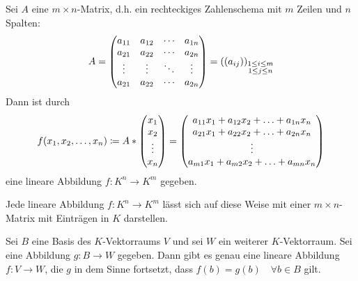 Sei $A$ eine $m\times n$-Matrix, d.h. ein rechteckiges Zahlenschema mit $m$ Zeilen und $n$ Spalten:
\newcommand{\ma}[1]{\ensuremath a_{#1}}
\begin{equation*}
  A=
  \matrix{
  \ma{11} & \ma{12} & \cdots & \ma{1n}\\
  \ma{21} & \ma{22} & \cdots & \ma{2n}\\
  \vdots & \vdots & \ddots & \vdots\\
  \ma{21} & \ma{22} & \cdots & \ma{2n}\\
  }
  = ((a_{ij}))_{\substack{1\leq i\leq m\\1\leq j\leq n}}
\end{equation*}
Dann ist durch
\begin{equation*}
  f(x_1,x_2,\ldots,x_n)\coloneqq A*\matrix{x_1\\x_2\\\vdots\\x_n}
  =\matrix{
  \ma{11}x_1+\ma{12}x_2+\ldots+\ma{1n}x_n\\
  \ma{21}x_1+\ma{22}x_2+\ldots+\ma{2n}x_n\\
  \vdots\\
  \ma{m1}x_1+\ma{m2}x_2+\ldots+\ma{mn}x_n\\
  }
\end{equation*}
eine lineare Abbildung $f:K^n\rightarrow K^m$ gegeben.

\bemerkung
Jede lineare Abbildung $f:K^n\rightarrow K^m$ lässt sich auf diese Weise mit einer $m\times n$-Matrix mit Einträgen in $K$ darstellen.

\begin{satz}{}
  Sei $B$ eine Basis des $K$-Vektorraums $V$ und sei $W$ ein weiterer $K$-Vektorraum.
  Sei eine Abbildung $g:B\rightarrow W$ gegeben. Dann gibt es genau eine lineare Abbildung $f:V\rightarrow W$, die $g$ in dem Sinne fortsetzt, dass $f(b)=g(b) \quad\forall b\in B$ gilt.
\end{satz}


